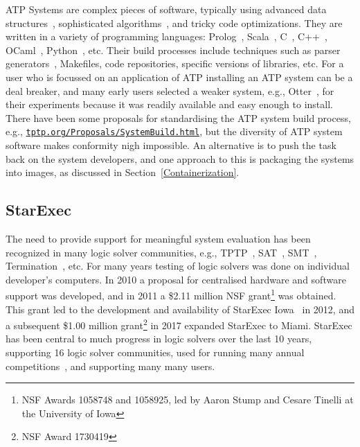 \documentclass{easychair}
\begin{document}
ATP Systems are complex pieces of software, typically using advanced data structures~\cite{Sch13}, 
sophisticated algorithms~\cite{Vor01}, and tricky code optimizations\cite{Sch06}.
They are written in a variety of programming languages: Prolog~\cite{Ott23,Hol23}, 
Scala~\cite{SB18}, C~\cite{SCV19}, C++~\cite{RV02-AICOMM}, OCaml~\cite{Kor06}, Python~\cite{SP20}, 
etc.
Their build processes include techniques such as parser generators~\cite{Ste21}, Makefiles,
code repositories, specific versions of libraries, etc.
For a user who is focussed on an application of ATP
installing an ATP system can be a deal breaker, and many early users selected a weaker system, 
e.g., Otter~\cite{McC03-Otter}, for their experiments because it was readily available and easy 
enough to install.
There have been some proposals for standardising the ATP system build process, e.g.,
\href{https://tptp.org/Proposals/SystemBuild.html}{\tt tptp.org/Proposals/SystemBuild.html}, 
but the diversity of ATP system software makes conformity nigh impossible.
An alternative is to push the task back on the system developers, and one approach to this is
packaging the systems into images, as discussed in Section~\ref{Containerization}.

\subsection{StarExec}
\label{StarExec}

The need to provide support for meaningful system evaluation has been recognized in many logic 
solver communities, e.g., TPTP~\cite{SS01}, SAT~\cite{HS00-SATLIB}, SMT~\cite{CSW15},
Termination~\cite{MZ07}, etc.
For many years testing of logic solvers was done on individual developer's computers. 
In 2010 a proposal for centralised hardware and software support was developed,
and in 2011 a \$2.11 million NSF grant\footnote{%
NSF Awards 1058748 and 1058925, led by Aaron Stump and Cesare Tinelli at the University of Iowa} 
was obtained.
This grant led to the development and availability of StarExec Iowa~\cite{SST14} in 2012,
and a subsequent \$1.00 million grant\footnote{%
NSF Award 1730419} in 2017 expanded StarExec to Miami.
StarExec has been central to much progress in logic solvers over the last 10 years, supporting
16 logic solver communities, used for running many annual competitions~\cite{BB+19}, and 
supporting many many users.
\end{document}
